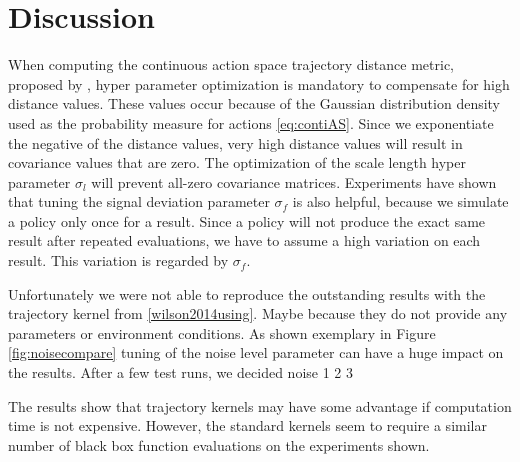 \chapter{Discussion}
\label{chap:6}

When computing the continuous action space trajectory distance metric, proposed by \cite{wilson2014using}, hyper parameter optimization is mandatory to compensate for high distance values. These values occur because of the Gaussian distribution density used as the probability measure for actions \ref{eq:contiAS}. Since we exponentiate the negative of the distance values, very high distance values will result in covariance values that are zero. The optimization of the scale length hyper parameter $\sigma_l$ will prevent all-zero covariance matrices. Experiments have shown that tuning the signal deviation parameter $\sigma_f$ is also helpful, because we simulate a policy only once for a result. Since a policy will not produce the exact same result after repeated evaluations, we have to assume a high variation on each result. This variation is regarded by $\sigma_f$.

Unfortunately we were not able to reproduce the outstanding results with the trajectory kernel from \ref{wilson2014using}. Maybe because they do not provide any parameters or environment conditions. As shown exemplary in Figure \ref{fig:noisecompare} tuning of the noise level parameter can have a huge impact on the results. After a few test runs, we decided noise 1 2 3

The results show that trajectory kernels may have some advantage if computation time is not expensive. However, the standard kernels seem to require a similar number of black box function evaluations on the experiments shown.



%
%
